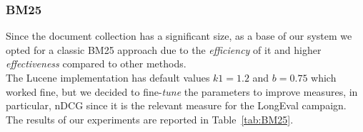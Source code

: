 \subsubsection{BM25}
\label{subsubsec:bm25}

Since the document collection has a significant size, as a base of our system we opted for a classic BM25\citep{RobertsonZaragoza2009} approach due to the \emph{efficiency} of it and higher \emph{effectiveness} compared to other methods.  \\
The Lucene \citep{Lucene} implementation has default values $k1=1.2$ and $b=0.75$ which worked fine, but we decided to fine-\emph{tune} the parameters to improve measures, in particular, \ac{nDCG} since it is the relevant measure for the LongEval campaign. The results of our experiments are reported in Table~\ref{tab:BM25}.

